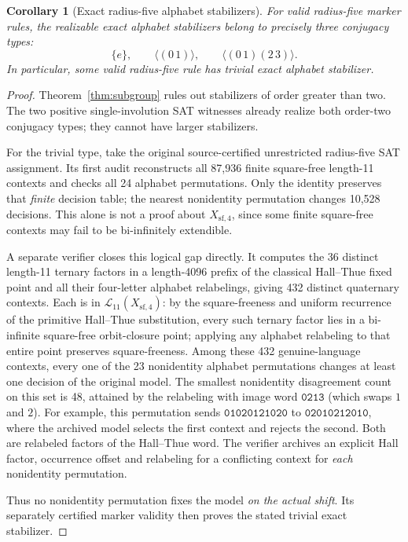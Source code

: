 \documentclass[11pt]{article}
\newtheorem{corollary}[theorem]{Corollary}
\theoremstyle{remark}
\newcommand{\Xsf}{X_{\mathrm{sf},4}}
\newcommand{\Lang}{\mathcal{L}}
\begin{document}
\begin{corollary}[Exact radius-five alphabet stabilizers]
\label{cor:exact-stabilizers}
For valid radius-five marker rules, the realizable
\emph{exact} alphabet stabilizers belong to precisely
three conjugacy types:
\[
 \{e\},\qquad \langle(0\,1)\rangle,\qquad
 \langle(0\,1)(2\,3)\rangle.
\]
In particular, some valid radius-five rule has trivial
exact alphabet stabilizer.
\end{corollary}
\begin{proof}
Theorem~\ref{thm:subgroup} rules out stabilizers of
order greater than two. The two positive single-involution
SAT witnesses already realize both order-two conjugacy
types; they cannot have larger stabilizers.

For the trivial type, take the original source-certified
unrestricted radius-five SAT assignment. Its first audit
reconstructs all 87,936 finite square-free length-11
contexts and checks all 24 alphabet permutations. Only
the identity preserves that \emph{finite} decision table;
the nearest nonidentity permutation changes 10,528
decisions. This alone is not a proof about $\Xsf$, since
some finite square-free contexts may fail to be
bi-infinitely extendible.

A separate verifier closes this logical gap directly.
It computes the 36 distinct length-11 ternary factors
in a length-4096 prefix of the classical Hall--Thue
fixed point and all their four-letter alphabet relabelings,
giving 432 distinct quaternary contexts. Each is in
$\Lang_{11}(\Xsf)$: by the square-freeness and
uniform recurrence of the primitive Hall--Thue
substitution, every such ternary factor lies in a
bi-infinite square-free orbit-closure point; applying
any alphabet relabeling to that entire point preserves
square-freeness. Among these 432 genuine-language
contexts, every one of the 23 nonidentity alphabet
permutations changes at least one decision of the
original model. The smallest nonidentity disagreement
count on this set is 48, attained by the relabeling
with image word $\texttt{0213}$ (which swaps $1$ and $2$).
For example, this permutation sends
$\texttt{01020121020}$ to $\texttt{02010212010}$,
where the archived model selects the first context
and rejects the second. Both are relabeled factors
of the Hall--Thue word. The verifier archives an
explicit Hall factor, occurrence offset and
relabeling for a conflicting context for \emph{each}
nonidentity permutation.

Thus no nonidentity permutation fixes the model
\emph{on the actual shift}. Its separately certified
marker validity then proves the stated trivial exact
stabilizer.
\end{proof}
\end{document}
